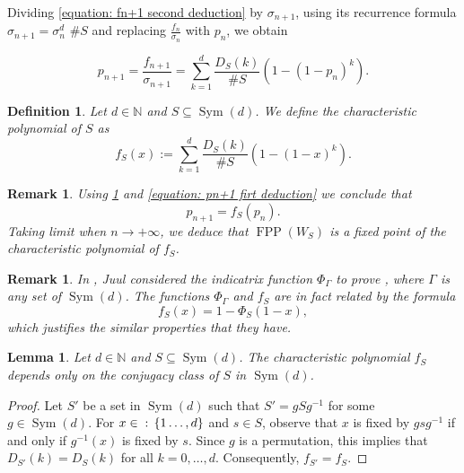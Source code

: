 \documentclass{amsart}
\def\set#1{{\def\st{\;:\;}\left\{#1\right\}}}
\def\NN{\mathbb N}
\DeclareMathOperator{\FPP}{FPP}
\DeclareMathOperator{\Sym}{Sym}
\DeclareMathOperator{\st}{st}
\newtheorem{Lemma}[Proposition]{Lemma}
\newtheorem{Definition}[Proposition]{Definition}
\newtheorem{Remark}[Proposition]{Remark}
\begin{document}
Dividing \cref{equation: fn+1 second deduction} by $\sigma_{n+1}$, using its recurrence formula $\sigma_{n+1} = \sigma_n^d \,\, \# S$ and replacing $\frac{f_n}{\sigma_n}$ with $p_n$, we obtain

\begin{equation}
p_{n+1} = \frac{f_{n+1}}{\sigma_{n+1}} = \sum_{k = 1}^d \frac{D_S(k)}{\# S} \left( 1 - \left( 1 - p_n \right)^k \right).
\label{equation: pn+1 firt deduction}
\end{equation}

\begin{Definition}
Let $d \in \NN$ and $S \subseteq \Sym(d)$. We define the \textit{characteristic polynomial} of $S$ as $$f_S(x) := \sum_{k = 1}^d \frac{D_S(k)}{\# S} \left( 1 - \left( 1 - x \right)^k \right).$$
\label{definition: characteristic polynomial}
\end{Definition}

\begin{Remark}
Using \cref{definition: characteristic polynomial} and \cref{equation: pn+1 firt deduction} we conclude that $$p_{n+1} = f_S(p_n).$$ Taking limit when $n \rightarrow +\infty$, we deduce that $\FPP(W_S)$ is a fixed point of the characteristic polynomial of $f_S$. 
\label{Remark: FPP is fixed point fS}
\end{Remark}

\begin{Remark}
In \cite{Juul2018}, Juul considered the indicatrix function $\Phi_\Gamma$ to prove \cite[Theorem 1.2]{Juul2018}, where $\Gamma$ is any set of $\Sym(d)$. The functions $\Phi_\Gamma$ and $f_S$ are in fact related by the formula $$f_S(x) = 1 - \Phi_S(1-x),$$ which justifies the similar properties that they have.
\end{Remark}


\begin{Lemma}
Let $d \in \NN$ and $S \subseteq \Sym(d)$. The characteristic polynomial $f_S$ depends only on the conjugacy class of $S$ in $\Sym(d)$.
\label{lemma: characteristic polynomial conjugacy class}
\end{Lemma}

\begin{proof}
Let $S'$ be a set in $\Sym(d)$ such that $S' = gSg^{-1}$ for some $g \in \Sym(d)$. For $x \in \set{1\dots,d}$ and $s \in S$, observe that $x$ is fixed by $gsg^{-1}$ if and only if $g^{-1}(x)$ is fixed by $s$. Since $g$ is a permutation, this implies that $D_{S'}(k) = D_S(k)$ for all $k = 0,\dots,d$. Consequently, $f_{S'} = f_S$.
\end{proof}
\end{document}

